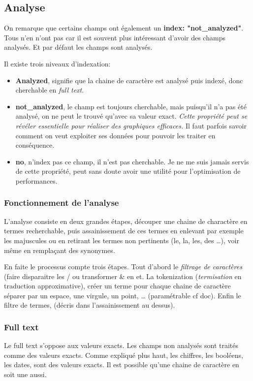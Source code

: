\subsection{Analyse}
On remarque que certains champs ont également un \textbf{index: "not\_analyzed"}.
Tous n'en n'ont pas car il est souvent plus intéressant d'avoir des champs analysés.
Et par défaut les champs sont analysés.

Il existe trois niveaux d'indexation:
\begin{itemize}
    \item   \textbf{Analyzed}, signifie que la chaine de caractère est analysé puis indexé,
    donc cherchable en \textit{full text}.
    \item   \textbf{not\_analyzed}, le champ est toujours cherchable, mais puisqu'il n'a pas 
    été analysé, on ne peut le trouvé qu'avec sa valeur exact. \emph{Cette propriété
    peut se révéler essentielle pour réaliser des graphiques efficaces.} 
    \footnotesize{Il faut parfois savoir comment on veut exploiter ses données pour
    pouvoir les traiter en conséquence.}
    \item \textbf{no}, n'index pas ce champ, il n'est pas cherchable. Je ne me suis
    jamais servis de cette propriété, peut sans doute avoir une utilité pour l'optimisation
    de performances.
\end{itemize}

\subsubsection{Fonctionnement de l'analyse}
L'analyse consiste en deux grandes étapes, découper une chaine de charactère en termes
recherchable, puis assainissement de ces termes en enlevant par exemple les majuscules
ou en retirant les termes non pertinents (le, la, les, des \ldots), voir même en 
remplaçant des synonymes.

En faite le processus compte trois étapes. Tout d'abord le \emph{filtrage de caractères}
(faire disparaitre les / ou transformer \& en et. La tokenization (\textit{termisation}
en traduction approximative), créer un terme pour chaque chaine de caractère séparer
par un espace, une virgule, un point, \ldots{} (paramétrable cf doc). Enfin le filtre
de termes, (décris dans l'assainissement au dessus).



\subsubsection{Full text}
Le full text s'oppose aux valeurs exacts.
Les champs non analysés sont traités comme des valeurs exacts.
Comme expliqué plus haut, les chiffres, les booléens, les dates, sont des valeurs 
exacts. Il est possible qu'une chaine de caractère en soit une aussi.

